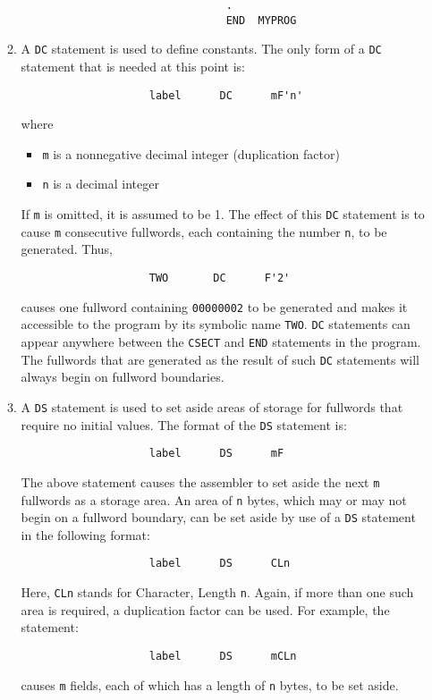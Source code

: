 \documentclass{report}
\begin{document}
\begin{itemize}
\begin{enumerate}
\begin{verbatim}
                                .
                                END  MYPROG
                            \end{verbatim}
                        \item A \texttt{DC} statement is used to define constants. The only form of a \texttt{DC} statement that is needed at this point is:
                            \begin{verbatim}
                    label      DC      mF'n'
                            \end{verbatim}
                            where 
                            \begin{itemize}
                                \item \texttt{m} is a nonnegative decimal integer (duplication factor)
                                \item \texttt{n} is a decimal integer
                            \end{itemize}

                            If \texttt{m} is omitted, it is assumed to be 1. The effect of this \texttt{DC} statement is to cause \texttt{m} consecutive fullwords, each containing the number \texttt{n}, to be generated. Thus,
                            \begin{verbatim}
                    TWO       DC      F'2'
                            \end{verbatim}
                            causes one fullword containing \texttt{00000002} to be generated and makes it accessible to the program by its symbolic name \texttt{TWO}. \texttt{DC} statements can appear anywhere between the \texttt{CSECT} and \texttt{END} statements in the program. The fullwords that are generated as the result of such \texttt{DC} statements will always begin on fullword boundaries.
\item A \texttt{DS} statement is used to set aside areas of storage for fullwords that require no initial values. The format of the \texttt{DS} statement is:
    \begin{verbatim}
                    label      DS      mF
    \end{verbatim}
    The above statement causes the assembler to set aside the next \texttt{m} fullwords as a storage area. An area of \texttt{n} bytes, which may or may not begin on a fullword boundary, can be set aside by use of a \texttt{DS} statement in the following format:
    \begin{verbatim}
                    label      DS      CLn
    \end{verbatim}
    Here, \texttt{CLn} stands for Character, Length \texttt{n}. Again, if more than one such area is required, a duplication factor can be used. For example, the statement:
    \begin{verbatim}
                    label      DS      mCLn
    \end{verbatim}
    causes \texttt{m} fields, each of which has a length of \texttt{n} bytes, to be set aside.


\end{enumerate}
\end{itemize}
\end{document}
